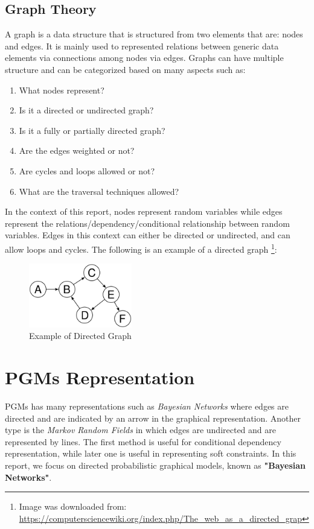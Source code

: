 \documentclass{article}
\begin{document}
\subsection{Graph Theory}
A graph is a data structure that is structured from two elements that are: nodes and edges. It is mainly used to represented relations between generic data elements via connections among nodes via edges. Graphs can have multiple structure and can be categorized based on many aspects such as:
\begin{enumerate}
\item What nodes represent?
\item Is it a directed or undirected graph?
\item Is it a fully or partially directed graph?
\item Are the edges weighted or not?
\item Are cycles and loops allowed or not?
\item What are the traversal techniques allowed?
\end{enumerate}
In the context of this report, nodes represent random variables while edges represent the relations/dependency/conditional relationship between random variables. Edges in this context can either be directed or undirected, and can allow loops and cycles. The following is an example of a directed graph \footnote{Image was downloaded from: \url{https://computersciencewiki.org/index.php/The_web_as_a_directed_grap}}:
\begin{figure}[H]
\centering
\includegraphics[width=0.4\textwidth]{Directed_graph.png}
\caption{Example of Directed Graph }
\end{figure}

\section{PGMs Representation}
PGMs has many representations such as \textit{Bayesian Networks} where edges are directed and are indicated by an arrow in the graphical representation. Another type is the \textit{Markov Random Fields} in which edges are undirected and are represented by lines. The first method is useful for conditional dependency representation, while later one is useful in representing soft constraints. In this report, we focus on directed probabilistic graphical models, known as \textbf{"Bayesian Networks"}.
\end{document}
